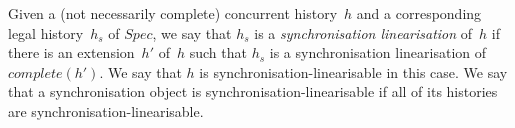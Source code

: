 
Given  a (not necessarily complete) concurrent history~$h$ and a corresponding
legal history~$h_s$ of $Spec$, we say that $h_s$ is a \emph{synchronisation
  linearisation} of~$h$ if 
there is an extension~$h'$ of~$h$ such that $h_s$ is a synchronisation
linearisation of $complete(h')$.
%
We say that $h$ is synchronisation-linearisable in this case.  We say that a
synchronisation object is synchronisation-linearisable if all of its histories
are synchronisation-linearisable.



